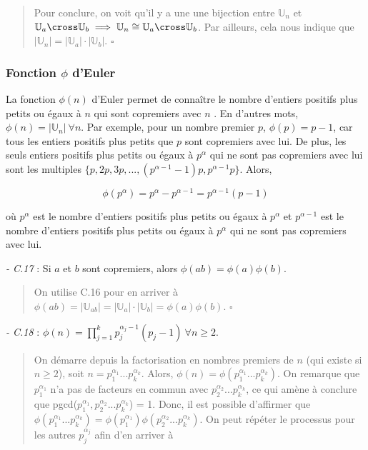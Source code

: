 \begin{quote}
    Pour conclure, on voit qu'il y a une une bijection entre $\mathbb{U}_n$ et $\mathbb{U}_a \cross \mathbb{U}_b \implies \mathbb{U}_n \cong \mathbb{U}_a \cross \mathbb{U}_b$. Par ailleurs, cela nous indique que $|\mathbb{U}_n| = |\mathbb{U}_a| \cdot |\mathbb{U}_b|$. $\square$
\end{quote}

\subsubsection*{Fonction $\phi$ d'Euler}
La fonction $\phi(n)$ d'Euler permet de connaître le nombre d'entiers positifs plus petits ou égaux à $n$ qui sont copremiers avec $n$ \cite{hardy75}. En d'autres mots, $\phi(n) = |\mathbb{U}_n| \ \forall n$. Par exemple, pour un nombre premier $p$, $\phi(p) = p - 1$, car tous les entiers positifs plus petits que $p$ sont copremiers avec lui. De plus, les seuls entiers positifs plus petits ou égaux à $p^{\alpha}$ qui ne sont pas copremiers avec lui sont les multiples $\{p, 2p, 3p, ..., (p^{\alpha - 1} - 1)p, p^{\alpha - 1}p\}$. Alors, 

\begin{equation*}
    \phi(p^{\alpha}) = p^{\alpha} - p^{\alpha - 1} = p^{\alpha - 1}(p-1)
\end{equation*}

où $p^{\alpha}$ est le nombre d'entiers positifs plus petits ou égaux à $p^{\alpha}$ et $p^{\alpha - 1}$ est le nombre d'entiers positifs plus petits ou égaux à $p^{\alpha}$ qui ne sont pas copremiers avec lui. 

\textit{- C.17} : Si $a$ et $b$ sont copremiers, alors $\phi(ab) = \phi(a)\phi(b)$.

\begin{quote}
    On utilise C.16 pour en arriver à $\phi(ab) = |\mathbb{U}_{ab}| = |\mathbb{U}_a| \cdot |\mathbb{U}_b| = \phi(a)\phi(b)$. $\square$
\end{quote}

\textit{- C.18} : $\phi(n) = \prod_{j=1}^{k}p_j^{\alpha_j - 1}(p_j - 1) \ \forall n \geq 2$. 

\begin{quote}
    On démarre depuis la factorisation en nombres premiers de $n$ (qui existe si $n \geq 2$), soit $n = p_1^{\alpha_1}...p_k^{\alpha_k}$. Alors, $\phi(n) = \phi(p_1^{\alpha_1}...p_k^{\alpha_k})$. On remarque que $p_1^{\alpha_1}$ n'a pas de facteurs en commun avec $p_2^{\alpha_2}...p_k^{\alpha_k}$, ce qui amène à conclure que pgcd($p_1^{\alpha_1}, p_2^{\alpha_2}...p_k^{\alpha_k}$) = 1. Donc, il est possible d'affirmer que $\phi(p_1^{\alpha_1}...p_k^{\alpha_k})  = \phi(p_1^{\alpha_1})\phi(p_2^{\alpha_2}...p_k^{\alpha_k})$. On peut répéter le processus pour les autres $p_j^{\alpha_j}$ afin d'en arriver à
\end{quote}

